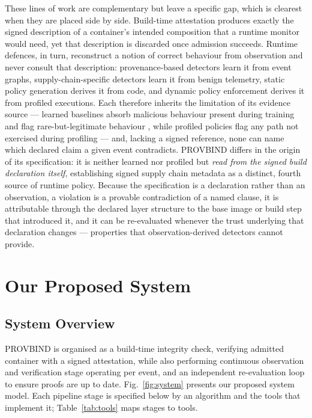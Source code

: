 \documentclass[conference]{IEEEtran}
\begin{document}
These lines of work are complementary but leave a specific gap, which is
clearest when they are placed side by side. Build-time attestation
\cite{intoto2019,slsa2023,sigstore2022} produces exactly the signed
description of a container's intended composition that a runtime monitor
would need, yet that description is discarded once admission succeeds.
Runtime defences, in turn, reconstruct a notion of correct behaviour
from observation and never consult that description: provenance-based
detectors \cite{nodlink2024,orthrus2025} learn it from event graphs,
supply-chain-specific detectors \cite{fusechain2026} learn it from
benign telemetry, static policy generation \cite{ghavamnia2020} derives
it from code, and dynamic policy enforcement \cite{goleash2025,yang2024}
derives it from profiled executions. Each therefore inherits the
limitation of its evidence source --- learned baselines absorb malicious
behaviour present during training and flag rare-but-legitimate behaviour
\cite{bilot2025}, while profiled policies flag any path not exercised
during profiling \cite{goleash2025} --- and, lacking a signed reference,
none can name which declared claim a given event contradicts.
PROVBIND differs in the origin of its specification: it is neither
learned nor profiled but \emph{read from the signed build declaration
itself}, establishing signed supply chain metadata as a distinct, fourth
source of runtime policy. Because the specification is a declaration
rather than an observation, a violation is a provable contradiction of a
named clause, it is attributable through the declared layer structure to
the base image or build step that introduced it, and it can be
re-evaluated whenever the trust underlying that declaration changes ---
properties that observation-derived detectors cannot provide.

\section{Our Proposed System}

\subsection{System Overview}

PROVBIND is organised as a build-time integrity check, verifying admitted
container with a signed attestation, while also performing continuous 
observation and verification stage operating per event, and an independent 
re-evaluation loop to ensure proofs are up to date. 
Fig.~\ref{fig:system} presents our proposed system model.
Each pipeline stage is specified below by an algorithm and the tools
that implement it; Table~\ref{tab:tools} maps stages to tools.
\end{document}
